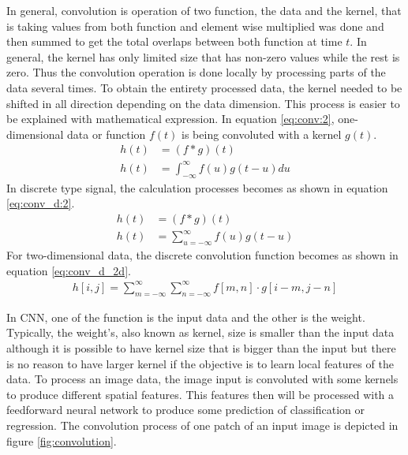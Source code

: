    In general, convolution is operation of two function, the data and
    the kernel, that is taking values from both function and
    element wise multiplied was done and then summed to get the total
    overlaps between both function at time $t$. In general, the kernel
    has only limited size that has non-zero values while the rest is
    zero. Thus the convolution operation is done locally by processing
    parts of the data several times. To obtain the entirety processed
    data, the kernel needed to be shifted in all direction depending
    on the data dimension. This process is easier to be explained with
    mathematical expression. In equation \ref{eq:conv:2},
    one-dimensional data or function $f(t)$ is being convoluted with a
    kernel $g(t)$.
    \begin{align}
        \label{eq:conv:1}
        h(t) &= (f * g)(t)\\
        \label{eq:conv:2}
        h(t) &= \int_{-\infty}^\infty f(u)g(t-u) du
    \end{align}
    In discrete type signal, the calculation processes becomes as
    shown in equation \ref{eq:conv_d:2}.
    \begin{align}
        \label{eq:conv_d:1}
        h(t) &= (f * g)(t)\\
        \label{eq:conv_d:2}
        h(t) &= \sum_{u = -\infty}^{\infty} f(u)g(t-u)
    \end{align}
    For two-dimensional data, the discrete convolution function
    becomes as shown in equation \ref{eq:conv_d_2d}.
    \begin{align}
        \label{eq:conv_d_2d}
        h[i, j] = \sum_{m = -\infty}^{\infty}\sum_{n = -\infty}^{\infty}f[m, n]\cdot g[i-m, j-n]
    \end{align}

    In CNN, one of the function is the input data and the other is the
    weight. Typically, the weight's, also known as kernel, size is
    smaller than the input data although it is possible to have kernel
    size that is bigger than the input but there is no reason to have
    larger kernel if the objective is to learn local features of the
    data. To process an image data, the image input is convoluted with
    some kernels to produce different spatial features. This features
    then will be processed with a feedforward neural network to
    produce some prediction of classification or regression. The
    convolution process of one patch of an input image is depicted in
    figure \ref{fig:convolution}.
    
